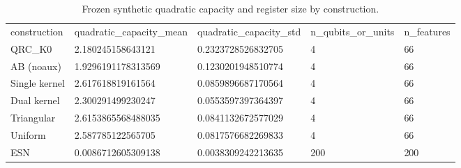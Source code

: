 \begin{table}
\caption{Frozen synthetic quadratic capacity and register size by construction.}
\label{tab:quadratic_capacity}
\begin{ruledtabular}
\begin{tabular}{lllll}
construction & quadratic_capacity_mean & quadratic_capacity_std & n_qubits_or_units & n_features \\
QRC_K0 & 2.180245158643121 & 0.2323728526832705 & 4 & 66 \\
AB (noaux) & 1.9296191178313569 & 0.1230201948510774 & 4 & 66 \\
Single kernel & 2.617618819161564 & 0.0859896687170564 & 4 & 66 \\
Dual kernel & 2.300291499230247 & 0.0553597397364397 & 4 & 66 \\
Triangular & 2.6153865568488035 & 0.0841132672577029 & 4 & 66 \\
Uniform & 2.587785122565705 & 0.0817576682269833 & 4 & 66 \\
ESN & 0.0086712605309138 & 0.0038309242213635 & 200 & 200 \\
\end{tabular}
\end{ruledtabular}
\end{table}